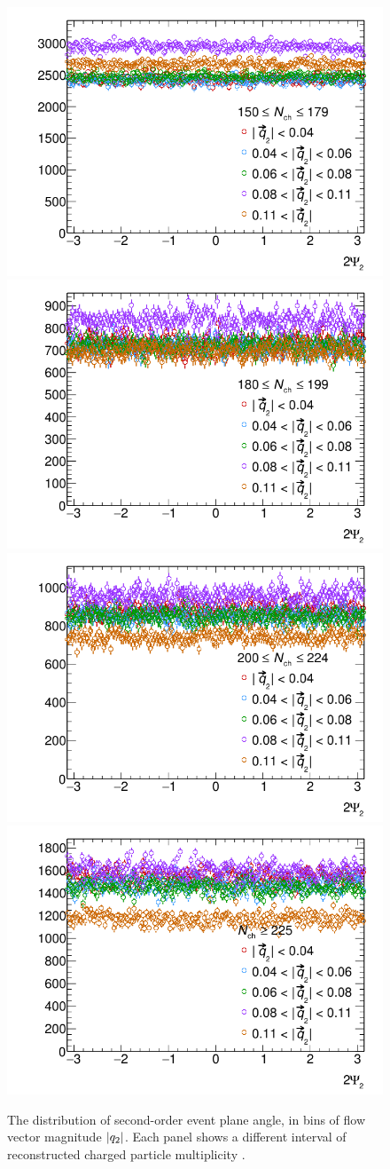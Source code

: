 \begin{figure}[t]
\centering
\includegraphics[width=.49\linewidth]{can_psi2_Nch150to179.png}
\includegraphics[width=.49\linewidth]{can_psi2_Nch180to199.png}
\includegraphics[width=.49\linewidth]{can_psi2_Nch200to224.png}
\includegraphics[width=.49\linewidth]{can_psi2_Nch225.png}
\caption{The distribution of second-order event plane angle, in bins of flow vector magnitude $|q_{2}|$. Each panel shows a different interval of reconstructed charged particle multiplicity \Nch.}
\label{fig:dNdpsi2_corr_binned}
\end{figure}



